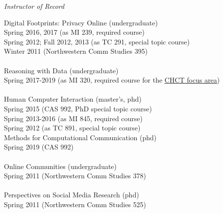 \documentclass[9pt]{extarticle}
\begin{document}
\emph{Instructor of Record} \\
\vspace{1pt}
\begin{tabbing}
Digital Footprints: Privacy Online (undergraduate) \\ 
\hspace{0.5cm} Spring 2016, 2017 (as MI 239, required course) \\
\hspace{0.5cm} Spring 2012; Fall 2012, 2013 (as TC 291, special topic course) \\ 
\hspace{0.5cm} Winter 2011 (Northwestern Comm Studies 395) \\\\

Reasoning with Data (undergraduate) \\
\hspace{0.5cm} Spring 2017-2019 (as MI 320, required course for the \href{http://mi.msu.edu/undergraduate-studies/majors/}{CHCT focus area}) \\\\

Human Computer Interaction (master's, phd) \\
\hspace{0.5cm} Spring 2015 (CAS 992, PhD special topic course) \\
\hspace{0.5cm} Spring 2013-2016 (as MI 845, required course) \\
\hspace{0.5cm} Spring 2012 (as TC 891, special topic course) \\

Methods for Computational Communication (phd) \\
\hspace{0.5cm} Spring 2019 (CAS 992) \\\\

Online Communities (undergraduate) \\
\hspace{0.5cm} Spring 2011 (Northwestern Comm Studies 378) \\\\

Perspectives on Social Media Research (phd)\\
\hspace{0.5cm} Spring 2011 (Northwestern Comm Studies 525) \\\\


\end{tabbing}
\end{document}
